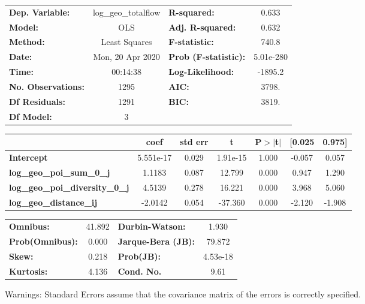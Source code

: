 \begin{center}
\begin{tabular}{lclc}
\toprule
\textbf{Dep. Variable:}                 & log\_geo\_totalflow & \textbf{  R-squared:         } &     0.633   \\
\textbf{Model:}                         &         OLS         & \textbf{  Adj. R-squared:    } &     0.632   \\
\textbf{Method:}                        &    Least Squares    & \textbf{  F-statistic:       } &     740.8   \\
\textbf{Date:}                          &   Mon, 20 Apr 2020  & \textbf{  Prob (F-statistic):} & 5.01e-280   \\
\textbf{Time:}                          &       00:14:38      & \textbf{  Log-Likelihood:    } &   -1895.2   \\
\textbf{No. Observations:}              &          1295       & \textbf{  AIC:               } &     3798.   \\
\textbf{Df Residuals:}                  &          1291       & \textbf{  BIC:               } &     3819.   \\
\textbf{Df Model:}                      &             3       & \textbf{                     } &             \\
\bottomrule
\end{tabular}
\begin{tabular}{lcccccc}
                                        & \textbf{coef} & \textbf{std err} & \textbf{t} & \textbf{P$> |$t$|$} & \textbf{[0.025} & \textbf{0.975]}  \\
\midrule
\textbf{Intercept}                      &    5.551e-17  &        0.029     &  1.91e-15  &         1.000        &       -0.057    &        0.057     \\
\textbf{log\_geo\_poi\_sum\_0\_j}       &       1.1183  &        0.087     &    12.799  &         0.000        &        0.947    &        1.290     \\
\textbf{log\_geo\_poi\_diversity\_0\_j} &       4.5139  &        0.278     &    16.221  &         0.000        &        3.968    &        5.060     \\
\textbf{log\_geo\_distance\_ij}         &      -2.0142  &        0.054     &   -37.360  &         0.000        &       -2.120    &       -1.908     \\
\bottomrule
\end{tabular}
\begin{tabular}{lclc}
\textbf{Omnibus:}       & 41.892 & \textbf{  Durbin-Watson:     } &    1.930  \\
\textbf{Prob(Omnibus):} &  0.000 & \textbf{  Jarque-Bera (JB):  } &   79.872  \\
\textbf{Skew:}          &  0.218 & \textbf{  Prob(JB):          } & 4.53e-18  \\
\textbf{Kurtosis:}      &  4.136 & \textbf{  Cond. No.          } &     9.61  \\
\bottomrule
\end{tabular}
\end{center}

Warnings: \newline
 [1] Standard Errors assume that the covariance matrix of the errors is correctly specified.